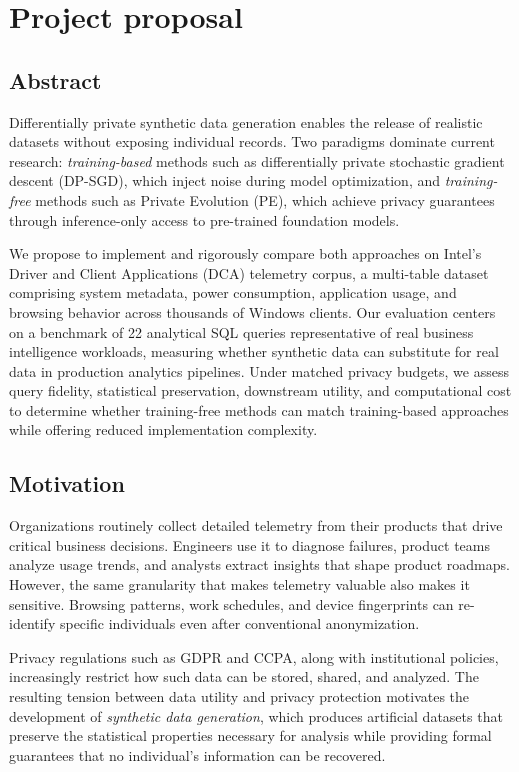 \documentclass[12pt,letterpaper]{article}
\renewcommand{\_}{\textunderscore\allowbreak}
\begin{document}
\newpage
\appendix

\section{Project proposal}

\subsection{Abstract}

Differentially private synthetic data generation enables the release of realistic datasets without exposing individual records. Two paradigms dominate current research: \textit{training-based} methods such as differentially private stochastic gradient descent (DP-SGD), which inject noise during model optimization, and \textit{training-free} methods such as Private Evolution (PE), which achieve privacy guarantees through inference-only access to pre-trained foundation models.

We propose to implement and rigorously compare both approaches on Intel's Driver and Client Applications (DCA) telemetry corpus, a multi-table dataset comprising system metadata, power consumption, application usage, and browsing behavior across thousands of Windows clients. Our evaluation centers on a benchmark of 22 analytical SQL queries representative of real business intelligence workloads, measuring whether synthetic data can substitute for real data in production analytics pipelines. Under matched privacy budgets, we assess query fidelity, statistical preservation, downstream utility, and computational cost to determine whether training-free methods can match training-based approaches while offering reduced implementation complexity.


\subsection{Motivation}

Organizations routinely collect detailed telemetry from their products that drive critical business decisions. Engineers use it to diagnose failures, product teams analyze usage trends, and analysts extract insights that shape product roadmaps. However, the same granularity that makes telemetry valuable also makes it sensitive. Browsing patterns, work schedules, and device fingerprints can re-identify specific individuals even after conventional anonymization.

Privacy regulations such as GDPR and CCPA, along with institutional policies, increasingly restrict how such data can be stored, shared, and analyzed. The resulting tension between data utility and privacy protection motivates the development of \textit{synthetic data generation}, which produces artificial datasets that preserve the statistical properties necessary for analysis while providing formal guarantees that no individual's information can be recovered.
\end{document}

